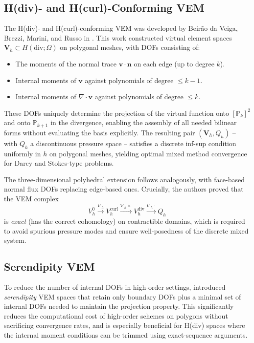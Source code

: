\subsection{H(div)- and H(curl)-Conforming VEM}

The H(div)- and H(curl)-conforming VEM was developed by Beir\~{a}o da Veiga,
Brezzi, Marini, and Russo in \cite{veigaHdivVEM2016}. This work constructed
virtual element spaces $\mathbf{V}_h \subset H(\mathrm{div};\Omega)$ on
polygonal meshes, with DOFs consisting of:
\begin{itemize}[nosep]
  \item The moments of the normal trace $\mathbf{v}\cdot\mathbf{n}$ on each
        edge (up to degree $k$).
  \item Internal moments of $\mathbf{v}$ against polynomials of degree $\leq k-1$.
  \item Internal moments of $\nabla\cdot\mathbf{v}$ against polynomials of
        degree $\leq k$.
\end{itemize}
These DOFs uniquely determine the projection of the virtual function onto
$[\mathbb{P}_k]^2$ and onto $\mathbb{P}_{k+1}$ in the divergence, enabling
the assembly of all needed bilinear forms without evaluating the basis
explicitly. The resulting pair $({\mathbf{V}_h}, Q_h)$ -- with $Q_h$ a
discontinuous pressure space -- satisfies a discrete inf-sup condition
uniformly in $h$ on polygonal meshes, yielding optimal mixed method
convergence for Darcy and Stokes-type problems.

The three-dimensional polyhedral extension \cite{veiga3DVEM2017} follows
analogously, with face-based normal flux DOFs replacing edge-based ones.
Crucially, the authors proved that the VEM complex
\[
  V_h^0 \xrightarrow{\nabla_h} V_h^{\mathrm{curl}}
        \xrightarrow{\nabla_h\times} V_h^{\mathrm{div}}
        \xrightarrow{\nabla_h\cdot} Q_h
\]
is \emph{exact} (has the correct cohomology) on contractible domains, which
is required to avoid spurious pressure modes and ensure well-posedness of
the discrete mixed system.

\subsection{Serendipity VEM}

To reduce the number of internal DOFs in high-order settings,
\cite{brezziSerendipityVEM2017} introduced \emph{serendipity} VEM spaces
that retain only boundary DOFs plus a minimal set of internal DOFs needed
to maintain the projection property. This significantly reduces the
computational cost of high-order schemes on polygons without sacrificing
convergence rates, and is especially beneficial for H(div) spaces where
the internal moment conditions can be trimmed using exact-sequence arguments.

